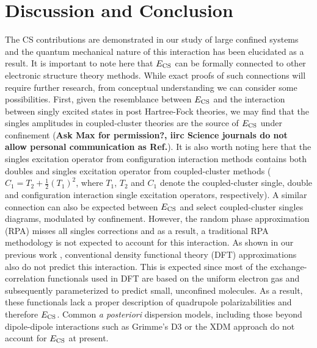 \documentclass[aps,prl,groupaddress, twocolumn]{revtex4-1}
\begin{document}
\section*{Discussion and Conclusion}
The CS contributions are demonstrated in our study of large confined systems and the quantum mechanical nature of this interaction has been elucidated as a result. It is important to note here that $E_{\rm CS}$ can be formally connected to other electronic structure theory methods. While exact proofs of such connections will require further research, from conceptual understanding we can consider some possibilities. First, given the resemblance between $E_{\rm CS}$ and the interaction between singly excited states in post Hartree-Fock theories, we may find that the singles amplitudes in coupled-cluster theories are the source of $E_{\rm CS}$ under confinement\cite{connect_CC} (\textbf{Ask Max for permission?, iirc Science journals do not allow personal communication as Ref.}). It is also worth noting here that the singles excitation operator from configuration interaction methods contains both doubles and singles excitation operator from coupled-cluster methods ($C_1 = T_2 + \frac{1}{2}(T_1)^2$, where $T_1$, $T_2$ and $C_1$ denote the coupled-cluster single, double and configuration interaction single excitation operators, respectively). A similar connection can also be expected between $E_{\rm CS}$ and select coupled-cluster singles diagrams, modulated by confinement. However, the random phase approximation (RPA) misses all singles corrections and as a result, a traditional RPA methodology is not expected to account for this interaction. As shown in our previous work \cite{sadhukhan_prl_2017}, conventional density functional theory (DFT) approximations also do not predict this interaction. This is expected since most of the exchange-correlation functionals used in DFT are  based on the uniform electron gas and subsequently parameterized to predict small, unconfined molecules. As a result, these functionals lack a proper description of quadrupole polarizabilities and therefore  $E_{\rm CS}$. Common \textit{a posteriori} dispersion models, including those beyond dipole-dipole interactions such as Grimme's D3\cite{grimme_2010} or the XDM approach \cite{becke_2006,angyan_2007,ayers_2009,heselmann_2009} do not account for $E_{\rm CS}$ at present.
\end{document}
